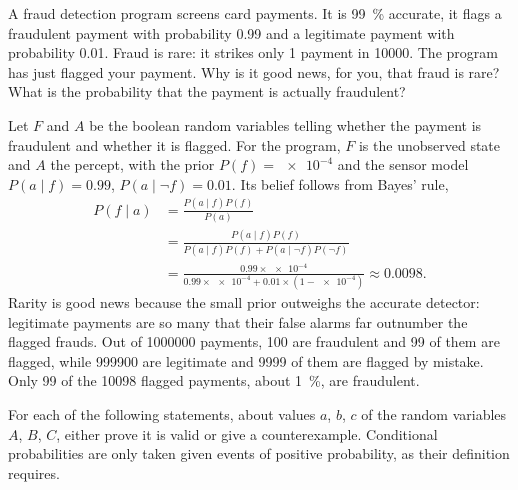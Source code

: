 \documentclass[11pt, a4paper]{exam}
\begin{document}
\begin{exercises}[1, 2, 3, 5]

A fraud detection program screens card payments. It is \qty{99}{\percent} accurate, \ie{} it flags a fraudulent payment with probability \num{0.99} and a legitimate payment with probability \num{0.01}. Fraud is rare: it strikes only 1 payment in \num{10000}. The program has just flagged your payment. Why is it good news, for you, that fraud is rare? What is the probability that the payment is actually fraudulent?

\begin{solution}
    Let $F$ and $A$ be the boolean random variables telling whether the payment is fraudulent and whether it is flagged. For the program, $F$ is the unobserved state and $A$ the percept, with the prior $P(f) = \num{e-4}$ and the sensor model $P(a \mid f) = 0.99$, $P(a \mid \neg f) = 0.01$. Its belief follows from Bayes' rule,
    \begin{align*}
        P(f \mid a) & = \frac{P(a \mid f) P(f)}{P(a)} \\
        & = \frac{P(a \mid f) P(f)}{P(a \mid f) P(f) + P(a \mid \neg f) P(\neg f)} \\
        & = \frac{0.99 \times \num{e-4}}{0.99 \times \num{e-4} + 0.01 \times (1 - \num{e-4})} \approx \num{0.0098} .
    \end{align*}
    Rarity is good news because the small prior outweighs the accurate detector: legitimate payments are so many that their false alarms far outnumber the flagged frauds. Out of \num{1000000} payments, \num{100} are fraudulent and \num{99} of them are flagged, while \num{999900} are legitimate and \num{9999} of them are flagged by mistake. Only \num{99} of the \num{10098} flagged payments, about \qty{1}{\percent}, are fraudulent.
\end{solution}


For each of the following statements, about values $a$, $b$, $c$ of the random variables $A$, $B$, $C$, either prove it is valid or give a counterexample. Conditional probabilities are only taken given events of positive probability, as their definition requires.

\end{exercises}
\end{document}
